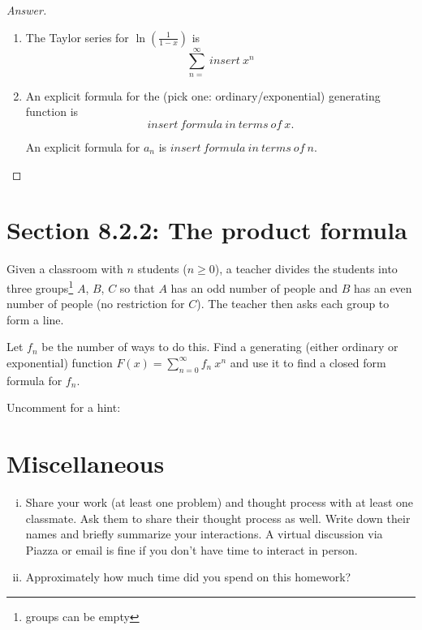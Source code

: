\documentclass[12pt]{amsart}
\begin{document}
\begin{proof}[Answer]
\begin{enumerate}
\item The Taylor series for $\ln\left(\frac{1}{1-x}\right)$  is \[\boxed{ \sum_{n=}^\infty ~ insert ~ x^n}\]

\item 
An explicit formula for the (pick one: ordinary/exponential) generating function is \[\boxed{insert ~ formula ~ in ~ terms ~ of ~ x}.\]

An explicit formula for $a_n$ is $\boxed{insert ~ formula ~ in ~ terms ~ of ~ n}$.

\end{enumerate}
\end{proof}






\section{Section 8.2.2: The product formula}
Given a classroom with $n$ students ($n \geq 0$), 
a teacher divides the students into three groups\footnote{groups can be empty} $A$, $B$, $C$ so that $A$ has an odd number of people and $B$ has an even number of people (no restriction for $C$). The teacher then asks each group to form a line. 

Let $f_n$ be the number of ways to do this. 
Find a generating (either ordinary or exponential) function $F(x) = \sum_{n=0}^\infty f_n ~ x^n$ and use it to find a closed form formula for $f_n$. 

{\tiny \noindent Uncomment for a hint:}




\section{Miscellaneous}
\begin{enumerate}[i.]
    \item Share your work (at least one problem) and thought process with at least one classmate. Ask them to share their thought process as well. Write down their names and briefly summarize your interactions. A virtual discussion via Piazza or email is fine if you don't have time to interact in person. 
    \item Approximately how much time did you spend on this homework?
\end{enumerate}
\end{document}
